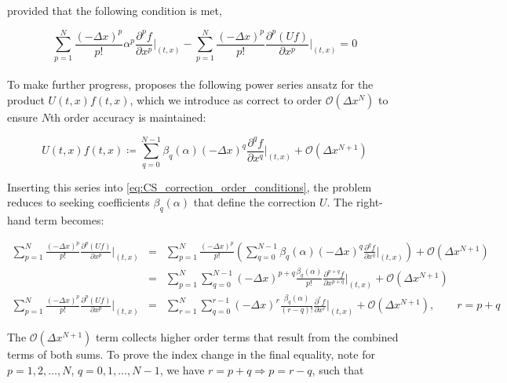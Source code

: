 \documentclass[11pt,titlepage]{report}
\begin{document}
\noindent provided that the following condition is met,

\begin{equation} \sum_{p = 1}^{N} \frac{(-\Delta x)^p}{p!}\alpha^p \frac{\partial^p f}{\partial x^p}\biggr|_{(t,x)} - \sum_{p = 1}^{N} \frac{(-\Delta x)^p}{p!}\frac{\partial^p(Uf)}{\partial x^p}\biggr|_{(t,x)} = 0\label{eq:CS_correction_order_conditions}
\end{equation}\\[0.1em]

To make further progress, \cite{Guclu14} proposes the following power series ansatz for the product $U(t,x)f(t,x)$, which we introduce as correct to order $\mathcal{O}(\Delta x^N)$ to ensure $N$th order accuracy is maintained:

\begin{equation}
U(t,x)f(t,x) \coloneqq \sum_{q = 0}^{N-1} \beta_q(\alpha )(-\Delta x)^q\frac{\partial^q f}{\partial x^q}\biggr|_{(t,x)} + \mathcal{O}(\Delta x^{N+1}) \label{eq:Uf_ansatz}
\end{equation}

\noindent Inserting this series into \eqref{eq:CS_correction_order_conditions}, the problem reduces to seeking coefficients $\beta_q(\alpha )$ that define the correction $U$. The right-hand term becomes:

\begin{eqnarray}
\sum_{p = 1}^{N} \frac{(-\Delta x)^p}{p!}\frac{\partial^p(Uf)}{\partial x^p}\biggr|_{(t,x)}  & = & \sum_{p = 1}^{N} \frac{(-\Delta x)^p}{p!}\left(\sum_{q = 0}^{N-1}  \beta_q(\alpha )(-\Delta x)^q\frac{\partial^q f}{\partial x^q}\biggr|_{(t,x)}\right) + \mathcal{O}(\Delta x^{N+1})\nonumber \\[0.3em]
& = & \sum_{p = 1}^{N}\sum_{q = 0}^{N-1}(-\Delta x)^{p+q}\frac{\beta_q(\alpha )}{p!} \frac{\partial^{p+q} f}{\partial x^{p+q}}\biggr|_{(t,x)} + \mathcal{O}(\Delta x^{N+1}) \label{eq:Double_summation_1}\\[0.3em]
\sum_{p = 1}^{N} \frac{(-\Delta x)^p}{p!}\frac{\partial^p(Uf)}{\partial x^p}\biggr|_{(t,x)} & = & \sum_{r = 1}^{N}\sum_{q = 0}^{r-1}(-\Delta x)^r\frac{\beta_q(\alpha )}{(r - q)!} \frac{\partial^r f}{\partial x^r}\biggr|_{(t,x)} + \mathcal{O}(\Delta x^{N+1}), \qquad r = p + q \label{eq:Double_summation_2}
\end{eqnarray}

\noindent The $\mathcal{O}(\Delta x^{N+1})$ term collects higher order terms that result from the combined terms of both sums. To prove the index change in the final equality, note for $p = 1, 2, \ldots, N$, $q = 0, 1, \ldots , N-1$, we have $r = p + q \Rightarrow p = r - q$, such that
\end{document}
